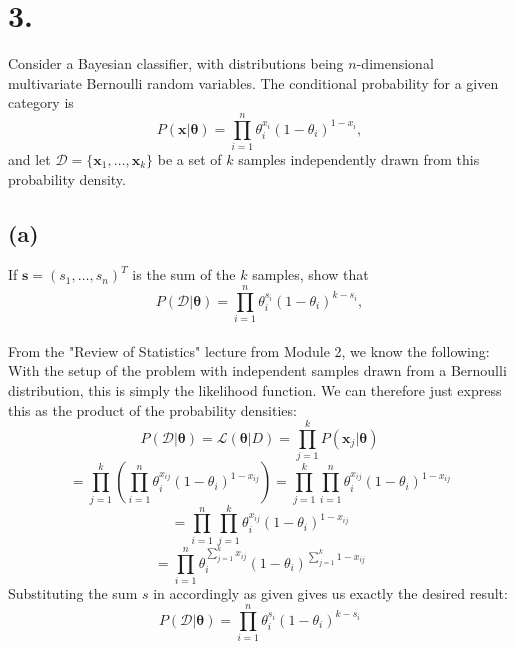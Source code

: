 \documentclass{article}
\begin{document}
{\Large 

\section*{3.}
Consider a Bayesian classifier, with distributions being \(n\)-dimensional multivariate Bernoulli random variables. The conditional probability for a given category is 
\[
  P(\mathbf{x} | \boldsymbol{\theta}) = \prod_{i=1}^{n} \theta_i^{x_i} (1 - \theta_i)^{1 - x_i},
\]
and let \(\mathcal{D} = \{\mathbf{x}_1, \dots, \mathbf{x}_k\}\) be a set of \(k\) samples independently drawn from this probability density. 

\subsection*{(a)} 
If \(\mathbf{s} = (s_1, \dots, s_n)^T\) is the sum of the \(k\) samples, show that 
\[
  P(\mathcal{D} | \boldsymbol{\theta}) = \prod_{i=1}^{n} \theta_i^{s_i} (1 - \theta_i)^{k - s_i},
\] \\
From the "Review of Statistics" lecture from Module 2, we know the following: With the setup of the problem with independent samples drawn from a Bernoulli distribution, this is simply the likelihood function. We can therefore just express this as the product of the probability densities:
\[
  P(\mathcal{D} | \boldsymbol{\theta}) = \mathcal{L}(\boldsymbol{\theta} | D) = \prod_{j=1}^{k} P(\mathbf{x}_j | \boldsymbol{\theta})
\]
\[
  = \prod_{j=1}^{k} (\prod_{i=1}^{n} \theta_i^{x_{ij}} (1 - \theta_i)^{1-x_{ij}}) = \prod_{j=1}^{k} \prod_{i=1}^{n} \theta_i^{x_{ij}} (1 - \theta_i)^{1-x_{ij}}
\]
\[
  = \prod_{i=1}^{n} \prod_{j=1}^{k} \theta_i^{x_{ij}} (1 - \theta_i)^{1-x_{ij}}
\]
\[
  = \prod_{i=1}^{n} \theta_i^{\sum_{j=1}^k x_{ij}} (1 - \theta_i)^{\sum_{j=1}^{k} 1-x_{ij}}
\]
Substituting the sum \(s\) in accordingly as given gives us exactly the desired result:
\[
  \boxed{P(\mathcal{D} | \boldsymbol{\theta}) = \prod_{i=1}^{n} \theta_i^{s_i} (1 - \theta_i)^{k - s_i}}
\]

}
\end{document}
